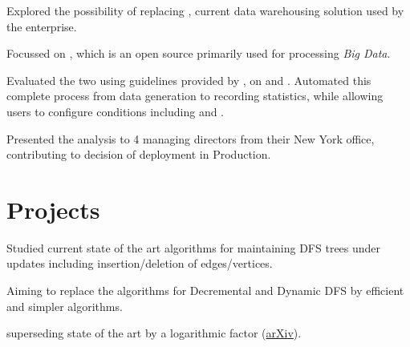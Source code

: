 \documentclass[a4paper]{norm-resume}
\begin{document}
\vspace{-1mm}

  
\begin{tightitemize}
        \small
        {
        \item Explored the possibility of  replacing , current data warehousing solution used by the enterprise.
        \item Focussed on , which is an open source  primarily used for processing \textit{Big Data}.
        \item Evaluated the two using guidelines provided by , on  and . Automated this complete process from data generation to recording statistics, while allowing users to configure conditions including  and .
        \item Presented the analysis to 4 managing directors from their New York office, contributing to decision of deployment in Production.
        }
\end{tightitemize}

\vspace{3mm} %


\section{Projects \hrulefill}

\vspace{2mm}

                
\begin{tightitemize}
        \small{
        \item Studied current state of the art algorithms for maintaining DFS trees under updates including insertion/deletion of edges/vertices.
        \item Aiming to replace the algorithms for Decremental and Dynamic DFS by efficient and simpler algorithms.
        \item {} superseding state of the art by a logarithmic factor (\href{https://arxiv.org/abs/1810.01726}{arXiv}).
        }
\end{tightitemize}
\end{document}
